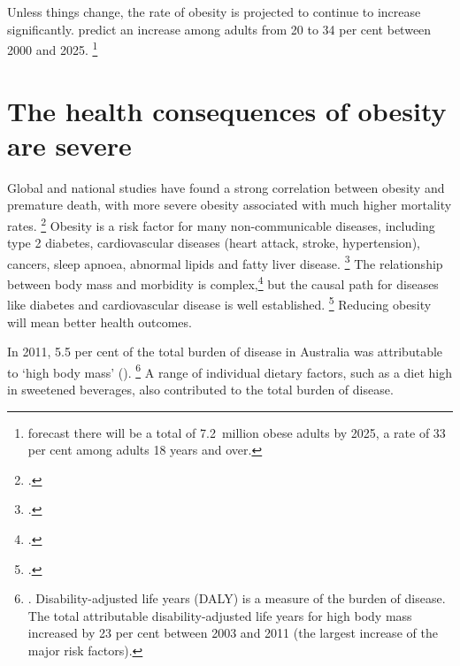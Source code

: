 \documentclass[embargoed]{grattan}
\begin{document}
Unless things change, the rate of obesity is projected to continue to increase significantly. \textcite{Walls2012Projectedprogressionprevalence} predict an increase among adults from 20 to 34 per cent between 2000 and 2025.%
\footnote{\textcite{PwC2015Weighingcostobesity} forecast there will be a total of 7.2~million obese adults by 2025, a rate of 33 per cent among adults 18 years and over.}

\section{The health consequences of obesity are severe}\label{the-health-consequences-of-obesity-are-severe}

Global and national studies have found a strong correlation between obesity and premature death, with more severe obesity associated with much higher mortality rates.%
\footcites{Collaboration2016Bodymassindex}{Aune2016BMIallcause}{Flegal2013Associationallcause}{Korda2013Prospectivecohortstudy} Obesity is a risk factor for many non-communicable diseases, including type 2 diabetes, cardiovascular diseases (heart attack, stroke, hypertension), cancers, sleep apnoea, abnormal lipids and fatty liver disease.%
\footcites[][39--40]{Organisation2000Dietnutritionprevention}{Must1999diseaseburdenassociated}{Collaboration2016Bodymassindex}{Nordstroem2016RisksMyocardialInfarction} The relationship between body mass and morbidity is complex,\footcites{Swinburn2004Dietnutritionprevention}{Livingston2012Progressobesityresearch} but the causal path for diseases like diabetes and cardiovascular disease is well established.%
\footcites{Poirier2006Obesitycardiovasculardisease}{Kritchevsky2015Intentionalweightloss}{Rueda-Clausen2015Healthbenefitslong}{Blackburn1995Effectdegreeweight} Reducing obesity will mean better health outcomes.



In 2011, 5.5 per cent of the total burden of disease in Australia was attributable to `high body mass' ().%
\footnote{\textcite[][Table~6.1]{Health2016AustralianBurdenDisease}.
Disability-adjusted life years (DALY) is a measure of the burden of disease.
The total attributable disability-adjusted life years for high body mass increased by 23 per cent between 2003 and 2011 (the largest increase of the major risk factors).} A range of individual dietary factors, such as a diet high in sweetened beverages, also contributed to the total burden of disease.
\end{document}
